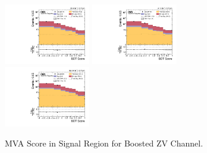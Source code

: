 \begin{figure}[!ht]
  \centering
  \includegraphics[width=0.335\textwidth]{analysis_plots/2016_zv/sr_l/mva_score_zv_var2_log.pdf} \hspace{-10pt}
  \includegraphics[width=0.335\textwidth]{analysis_plots/2017_zv/sr_l/mva_score_zv_var2_log.pdf} \hspace{-10pt}
  \includegraphics[width=0.335\textwidth]{analysis_plots/2018_zv/sr_l/mva_score_zv_var2_log.pdf} \hspace{-10pt} \\
  \caption[MVA Score in Signal Region for Boosted ZV Channel]%
  {MVA Score in Signal Region for Boosted ZV Channel.}%
  \label{fig:zv-sr-l-mva-score}
\end{figure}

